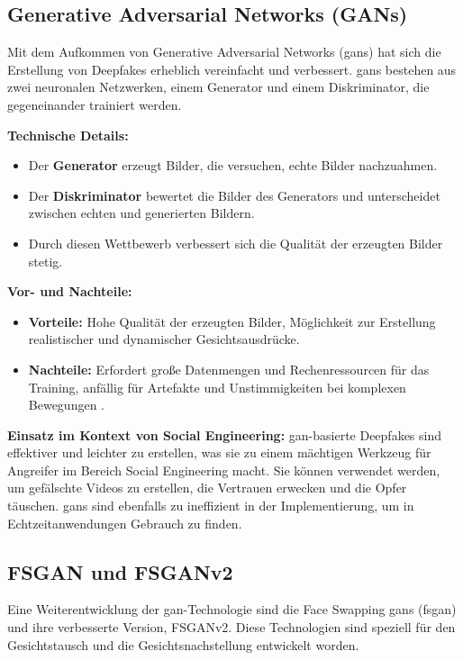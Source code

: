 \subsection{Generative Adversarial Networks (GANs)}\label{subsec:gans}

Mit dem Aufkommen von Generative Adversarial Networks (\glspl{gan}) hat sich die Erstellung von Deepfakes erheblich vereinfacht und verbessert.
\glspl{gan} bestehen aus zwei neuronalen Netzwerken, einem Generator und einem Diskriminator, die gegeneinander trainiert werden.\cite{Deepfakes-a-survey-and-introduction-to-the-topical-collection}

\textbf{Technische Details:}
\begin{itemize}
    \item Der \textbf{Generator} erzeugt Bilder, die versuchen, echte Bilder nachzuahmen.
    \item Der \textbf{Diskriminator} bewertet die Bilder des Generators und unterscheidet zwischen echten und generierten Bildern.
    \item Durch diesen Wettbewerb verbessert sich die Qualität der erzeugten Bilder stetig.
\end{itemize}

\textbf{Vor- und Nachteile:}
\begin{itemize}
    \item \textbf{Vorteile:} Hohe Qualität der erzeugten Bilder, Möglichkeit zur Erstellung realistischer und dynamischer Gesichtsausdrücke.
    \item \textbf{Nachteile:} Erfordert große Datenmengen und Rechenressourcen für das Training, anfällig für Artefakte und Unstimmigkeiten bei komplexen Bewegungen \cite{Deepfakes-An-Overview}.
\end{itemize}

\textbf{Einsatz im Kontext von Social Engineering:} \gls{gan}-basierte Deepfakes sind effektiver und leichter zu erstellen, was sie zu einem mächtigen Werkzeug für Angreifer im Bereich Social Engineering macht.
Sie können verwendet werden, um gefälschte Videos zu erstellen, die Vertrauen erwecken und die Opfer täuschen.
\glspl{gan} sind ebenfalls zu ineffizient in der Implementierung, um in Echtzeitanwendungen Gebrauch zu finden.

\subsection{FSGAN und FSGANv2}\label{subsec:fsgan}

Eine Weiterentwicklung der \gls{gan}-Technologie sind die Face Swapping \glspl{gan} (\gls{fsgan}) und ihre verbesserte Version, FSGANv2.
Diese Technologien sind speziell für den Gesichtstausch und die Gesichtsnachstellung entwickelt worden.

